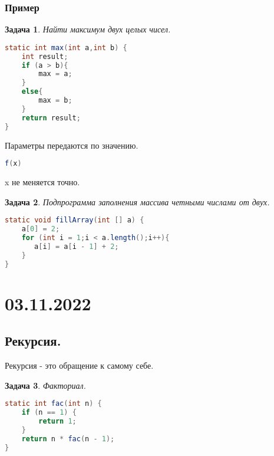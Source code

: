 \documentclass{scrartcl}
\newtheorem{task}{Задача}
\begin{document}
\subsubsection{Пример}
\begin{task}
    Найти максимум двух целых чисел.
\end{task}
\begin{lstlisting}[language=Java] 
static int max(int a,int b) {
    int result;
    if (a > b){
        max = a;
    }
    else{
        max = b;
    }
    return result;
}
\end{lstlisting} 
Параметры передаются по значению.
\begin{lstlisting}[language=Java] 
f(x) 
\end{lstlisting}
x не меняется точно.
\begin{task}
    Подпрограмма заполнения массива четными числами от двух.
\end{task}
\begin{lstlisting}[language=Java] 
static void fillArray(int [] a) {
    a[0] = 2;
    for (int i = 1;i < a.length();i++){
       a[i] = a[i - 1] + 2;
    }
}
\end{lstlisting} 
\section{03.11.2022}
\subsection{Рекурсия.}
Рекурсия - это обращение к самому себе.
\begin{task}
    Факториал.
\end{task}
\begin{lstlisting}[language=Java] 
static int fac(int n) {
    if (n == 1) {
        return 1;
    }
    return n * fac(n - 1);
}
\end{lstlisting} 
\end{document}
